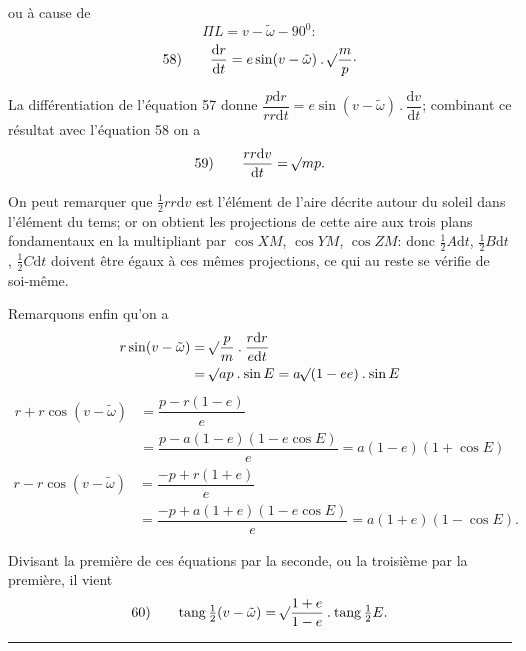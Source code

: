 ou à cause de
\[
\Pi L=v-\tilde\omega-90^{0}:
\]
\[
\begin{array}{rl}58)\quad&\dfrac{\mathrm{d}r}{\mathrm{d}t}=e\sin(v-\tilde\omega)\mathbin{.}\mathord{{}^{}\!\surd}\dfrac{m}{p}\mathpunct{\cdot}\end{array}
\]
\par La différentiation de l’équation 57 donne \(\dfrac{p\mathrm{d}r}{rr\mathrm{d}t}=e\sin(v-\tilde\omega)\mathbin{.}\dfrac{\mathrm{d}v}{\mathrm{d}t}\); combinant ce résultat avec l’équation 58 on a
\[
\begin{array}{rl}59)\quad&\dfrac{rr\mathrm{d}v}{\mathrm{d}t}=\mathord{{}^{}\!\surd}mp.\end{array}
\]
\par On peut remarquer que \(\tfrac12rr\mathrm{d}v\) est l’élément de l’aire décrite autour du soleil dans l’élément du tems; or on obtient les projections de cette aire aux trois plans fondamentaux en la multipliant par \(\cos XM\), \(\cos YM\), \(\cos ZM\): donc \(\tfrac12A\mathrm{d}t\), \(\tfrac12B\mathrm{d}t\), \(\tfrac12C\mathrm{d}t\) doivent être égaux à ces mêmes projections, ce qui au reste se vérifie de soi-même.
\par Remarquons enfin qu’on a
\[
\begin{aligned}
r\sin(v-\tilde\omega)&=\mathord{{}^{}\!\surd}\dfrac{p}{m}\mathbin{.}\dfrac{r\mathrm{d}r}{e\mathrm{d}t}\\
&=\mathord{{}^{}\!\surd}ap\mathbin{.}\sin E=a\mathord{{}^{}\!\surd}(1-ee)\mathbin{.}\sin E
\end{aligned}
\]
\[
\begin{aligned}
r+r\cos(v-\tilde\omega)&=\dfrac{p-r(1-e)}{e}\\
&=\dfrac{p-a(1-e)(1-e\cos E)}{e}=a(1-e)(1+\cos E)
\end{aligned}
\]
\[
\begin{aligned}
r-r\cos(v-\tilde\omega)&=\dfrac{-p+r(1+e)}{e}\\
&=\dfrac{-p+a(1+e)(1-e\cos E)}{e}=a(1+e)(1-\cos E).
\end{aligned}
\]
\par Divisant la première de ces équations par la seconde, ou la troisième par la première, il vient
\[
\begin{array}{rl}60)\quad&\operatorname{tang}\tfrac12(v-\tilde\omega)=\mathord{{}^{}\!\surd}\dfrac{1+e}{1-e}\mathbin{.}\operatorname{tang}\tfrac12E.\end{array}
\]
\par\medskip\begin{center}\rule{.18\textwidth}{.3pt}\end{center}
